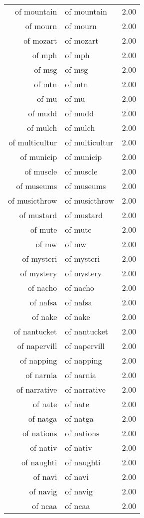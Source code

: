 \begin{table}[ht]
\begin{tabular}{rlr}
  of mountain & of mountain & 2.00 \\ 
  of mourn & of mourn & 2.00 \\ 
  of mozart & of mozart & 2.00 \\ 
  of mph & of mph & 2.00 \\ 
  of msg & of msg & 2.00 \\ 
  of mtn & of mtn & 2.00 \\ 
  of mu & of mu & 2.00 \\ 
  of mudd & of mudd & 2.00 \\ 
  of mulch & of mulch & 2.00 \\ 
  of multicultur & of multicultur & 2.00 \\ 
  of municip & of municip & 2.00 \\ 
  of muscle & of muscle & 2.00 \\ 
  of museums & of museums & 2.00 \\ 
  of musicthrow & of musicthrow & 2.00 \\ 
  of mustard & of mustard & 2.00 \\ 
  of mute & of mute & 2.00 \\ 
  of mw & of mw & 2.00 \\ 
  of mysteri & of mysteri & 2.00 \\ 
  of mystery & of mystery & 2.00 \\ 
  of nacho & of nacho & 2.00 \\ 
  of nafsa & of nafsa & 2.00 \\ 
  of nake & of nake & 2.00 \\ 
  of nantucket & of nantucket & 2.00 \\ 
  of napervill & of napervill & 2.00 \\ 
  of napping & of napping & 2.00 \\ 
  of narnia & of narnia & 2.00 \\ 
  of narrative & of narrative & 2.00 \\ 
  of nate & of nate & 2.00 \\ 
  of natga & of natga & 2.00 \\ 
  of nations & of nations & 2.00 \\ 
  of nativ & of nativ & 2.00 \\ 
  of naughti & of naughti & 2.00 \\ 
  of navi & of navi & 2.00 \\ 
  of navig & of navig & 2.00 \\ 
  of ncaa & of ncaa & 2.00 \\ 

\end{tabular}
\end{table}
